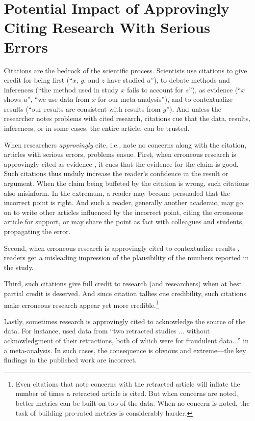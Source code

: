 \documentclass[12pt, letterpaper]{article}
\begin{document}
\section*{Potential Impact of Approvingly Citing Research With Serious Errors}

Citations are the bedrock of the scientific process. Scientists use citations to give credit for being first (``$x$, $y$, and $z$ have studied $a$''), to debate methods and inferences (``the method used in study $x$ fails to account for $s$''), as evidence (``$x$ shows $a$'', ``we use data from $x$ for our meta-analysis''), and to contextualize results (``our results are consistent with results from $y$''). And unless the researcher notes problems with cited research, citations cue that the data, results, inferences, or in some cases, the entire article, can be trusted.

When researchers \textit{approvingly} cite, i.e., note no concerns along with the citation, articles with serious errors, problems ensue. First, when erroneous research is approvingly cited as evidence \citep[e.g.,][]{chang2013safety, torsvik2010spontaneous}, it cues that the evidence for the claim is good. Such citations thus unduly increase the reader's confidence in the result or argument. When the claim being buffeted by the citation is wrong, such citations also misinform. In the extremum, a reader may become persuaded that the incorrect point is right. And such a reader, generally another academic, may go on to write other articles influenced by the incorrect point, citing the erroneous article for support, or may share the point as fact with colleagues and students, propagating the error.

Second, when erroneous research is approvingly cited to contextualize results \citep[e.g.,][]{kosaka2012therapeutic}, readers get a misleading impression of the plausibility of the numbers reported in the study.

Third, such citations give full credit to research (and researchers) when at best partial credit is deserved. And since citation tallies cue credibility, such citations make erroneous research appear yet more credible.\footnote{Even citations that note concerns with the retracted article will inflate the number of times a retracted article is cited. But when concerns are noted, better metrics can be built on top of the data. When no concern is noted, the task of building pro-rated metrics is considerably harder.}

Lastly, sometimes research is approvingly cited to acknowledge the source of the data. For instance, \citet{lin2013perioperative} used data from ``two retracted studies ... without acknowledgment of their retractions, both of which were for fraudulent data...'' \citep[p. 1][]{paul2015comment} in a meta-analysis. In such cases, the consequence is obvious and extreme---the key findings in the published work are incorrect.
\end{document}

